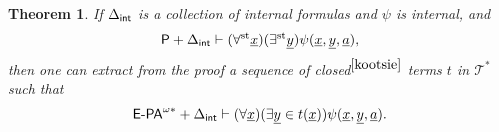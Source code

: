 \documentclass[reqno]{amsart}
\newtheorem{thm}{Theorem}
\newcommand\be{\begin{equation}}
\newcommand\ee{\end{equation}}
\def\P{\textup{\textsf{P}}}
\def\st{\textup{st}}
\def\intern{\textup{\textsf{int}}}
\numberwithin{equation}{section}
\numberwithin{thm}{section}
\begin{document}
\begin{thm}\label{consresultcor}
If $\Delta_{\intern}$ is a collection of internal formulas and $\psi$ is internal, and
\be\label{bog}
\P + \Delta_{\intern} \vdash (\forall^{\st}\underline{x})(\exists^{\st}\underline{y})\psi(\underline{x},\underline{y}, \underline{a}), 
\ee
then one can extract from the proof a sequence of closed$^{\ref{kootsie}}$ terms $t$ in $\mathcal{T}^{*}$ such that
\be\label{effewachten}
\textup{\textsf{E-PA}}^{\omega*} + \Delta_{\intern} \vdash (\forall \underline{x})(\exists \underline{y}\in t(\underline{x}))\psi(\underline{x},\underline{y},\underline{a}).
\ee
\end{thm}
\end{document}
